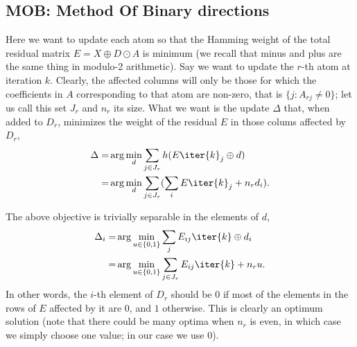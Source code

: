 \documentclass[twocolumn]{IEEEtran}
\begin{document}
%
%
%  
\subsection{MOB: Method Of Binary directions}
 
Here we want to update each atom so that the Hamming weight of the total residual matrix $E = X \oplus D \odot A$ is minimum (we recall that minus and plus are the same thing in modulo-2 arithmetic). Say we want to update the $r$-th atom at iteration $k$. Clearly, the affected columns will only be those for which the  coefficients in $A$  corresponding to that atom are non-zero, that is $\{j : A_{rj} \neq 0 \}$; let us call this set $J_r$ and $n_r$ its size. What we want is the update $\Delta$ that, when added to $D_r$, minimizes the weight of the residual $E$ in those colums affected by $D_r$,
 \begin{eqnarray}
 \Delta  =& \arg\min_d \sum_{j \in J_r}  h(E\iter{k}_j \oplus d) \\
 =& \arg\min_d \sum_{j \in J_r} (\sum_i E\iter{k}_j + n_r d_i).
\label{eq:mob1}
 \end{eqnarray}

The above objective is trivially separable in the elements of $d$,
 \begin{eqnarray}
 \Delta_i  =& \arg\min_{u \in \{0,1\}} \sum_j E_{ij}\iter{k} \oplus d_i\\
 =& \arg\min_{u \in \{0,1\}} \sum_{j\in J_r} E_{ij}\iter{k} + n_r u.
\label{eq:mob2}
 \end{eqnarray}
In other words, the $i$-th element of $D_r$ should be $0$ if most of the elements in the rows of $E$ affected by it are $0$, and $1$ otherwise. 
This is clearly an optimum solution (note that there could be many optima  when $n_r$ is even, in which case we simply choose one value; in our case we use $0$).
\end{document}
